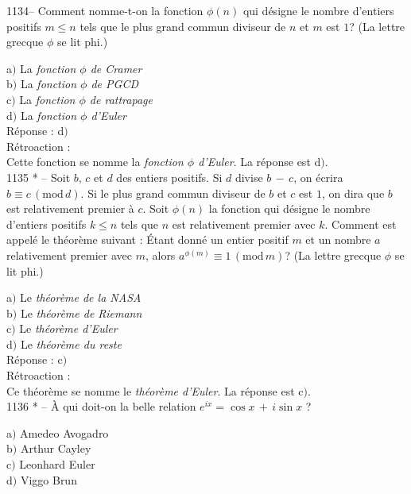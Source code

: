 ﻿\documentclass[letterpaper, 12pt]{article}
\begin{document}
1134-- Comment nomme-t-on la fonction $\phi(n)$ qui d\'esigne le
nombre d'entiers positifs $m\le n$ tels que le plus grand commun
diviseur de $n$ et $m$ est $1$? (La lettre grecque $\phi$ se lit
phi.)

a$)$ La {\sl fonction $\phi$ de Cramer} \\
b$)$ La {\sl fonction $\phi$ de PGCD}   \\
c$)$ La {\sl fonction $\phi$ de rattrapage} \\
d$)$ La {\sl fonction $\phi$ d'Euler}\\

R\'eponse : d$)$\\

R\'etroaction : \\
Cette fonction se nomme la {\sl fonction $\phi$ d'Euler}. La r\'eponse est
d$)$. \\

1135 * -- Soit $b$, $c$ et $d$ des entiers positifs. Si $d$ divise
$b\,-\,c$, on \'ecrira $b\equiv c\,(\mathrm{mod}\,d)$. Si le plus
grand commun diviseur de $b$ et $c$ est $1$, on dira que $b$ est
relativement premier \`a $c$. Soit $\phi(n)$ la fonction qui
d\'esigne le nombre d'entiers positifs $k\le n$ tels que $n$ est
relativement premier avec $k$. Comment est appel\'e le th\'eor\`eme
suivant : \og\'Etant donn\'e un entier positif $m$ et un nombre $a$
relativement premier avec $m$, alors $a^{\phi(m)}\equiv
1\,(\mathrm{mod}\,m)$\fg ? (La lettre grecque $\phi$ se lit phi.)

a$)$ Le {\sl th\'eor\`eme de la NASA} \\
b$)$ Le {\sl th\'eor\`eme de Riemann}  \\
c$)$ Le {\sl th\'eor\`eme d'Euler}   \\
d$)$ Le {\sl th\'eor\`eme du reste}  \\

R\'eponse : c$)$\\

R\'etroaction : \\
Ce th\'eor\`eme se nomme le {\sl th\'eor\`eme d'Euler}. La r\'eponse est
c$)$. \\

1136 * -- \`A qui doit-on la belle relation $e^{ix}=\cos x\,+\,i\sin
x$ ?

a$)$ Amedeo Avogadro \\
b$)$ Arthur Cayley  \\
c$)$ Leonhard Euler   \\
d$)$ Viggo Brun  \\
\end{document}
